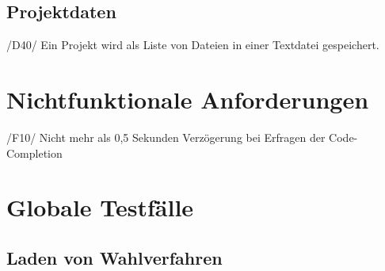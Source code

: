 \documentclass[a4paper]{scrreprt}
\begin{document}
\section{Projektdaten}
/D40/ Ein Projekt wird als Liste von Dateien in einer Textdatei gespeichert.


\chapter{Nichtfunktionale Anforderungen}
/F10/ Nicht mehr als 0,5 Sekunden Verzögerung bei Erfragen der Code-Completion


\chapter{Globale Testfälle}
\section{Laden von Wahlverfahren}
\end{document}
